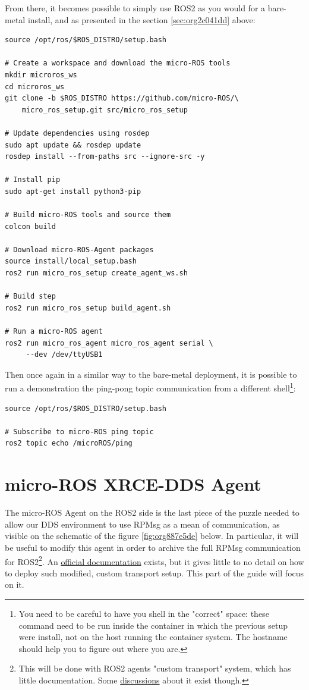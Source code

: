 \documentclass[10pt]{article}
\begin{document}
From there, it becomes possible to simply use ROS2 as you would for a bare-metal install,
and as presented in the section \ref{sec:org2c041dd} above:
\begin{verbatim}
source /opt/ros/$ROS_DISTRO/setup.bash

# Create a workspace and download the micro-ROS tools
mkdir microros_ws
cd microros_ws
git clone -b $ROS_DISTRO https://github.com/micro-ROS/\
    micro_ros_setup.git src/micro_ros_setup

# Update dependencies using rosdep
sudo apt update && rosdep update
rosdep install --from-paths src --ignore-src -y

# Install pip
sudo apt-get install python3-pip

# Build micro-ROS tools and source them
colcon build

# Download micro-ROS-Agent packages
source install/local_setup.bash
ros2 run micro_ros_setup create_agent_ws.sh

# Build step
ros2 run micro_ros_setup build_agent.sh

# Run a micro-ROS agent
ros2 run micro_ros_agent micro_ros_agent serial \
     --dev /dev/ttyUSB1
\end{verbatim}

Then once again in a similar way to the bare-metal deployment,  it is possible to run a demonstration
the ping-pong topic communication from a different shell\footnote{You need to be careful to have you shell in the "correct" space: these command need to be run inside
the container in which the previous setup were install, not on the host running the container system.
The hostname should help you to figure out where you are.}:
\begin{verbatim}
source /opt/ros/$ROS_DISTRO/setup.bash

# Subscribe to micro-ROS ping topic
ros2 topic echo /microROS/ping
\end{verbatim}
\pagebreak

\section{micro-ROS XRCE-DDS Agent}
\label{sec:org71f06f8}
The micro-ROS Agent on the ROS2 side is the last piece of the puzzle needed to
allow our DDS environment to use RPMsg as a mean of communication, as visible
on the schematic of the figure \ref{fig:org887e5de} below.
In particular, it will be useful to modify this agent in order to archive
the full RPMsg communication for ROS2\footnote{This will be done with ROS2 agents "custom transport"  system,
which has little documentation. Some \href{https://github.com/micro-ROS/micro\_ros\_setup/issues/383}{discussions} about it exist though.}.
An \href{https://micro.ros.org/docs/tutorials/advanced/create\_custom\_transports/}{official documentation} exists, but it gives little to no detail
on how to deploy such modified, custom transport setup.
This part of the guide will focus on it.
\end{document}
